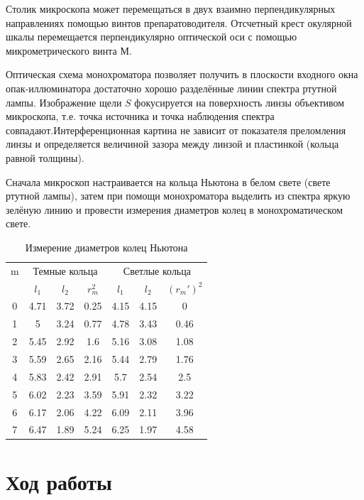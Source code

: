 \documentclass[12pt]{kiarticle}
\begin{document}
	Столик микроскопа может перемещаться в двух взаимно перпендикулярных направлениях помощью винтов препаратоводителя. Отсчетный крест окулярной шкалы перемещается перпендикулярно оптической оси с помощью микрометрического винта $ М $.
	
	Оптическая схема монохроматора позволяет получить в плоскости входного окна опак-иллюминатора достаточно хорошо разделённые линии спектра ртутной лампы. Изображение щели $ S $ фокусируется на поверхность линзы объективом микроскопа, т.е. точка источника и точка наблюдения спектра совпадают.Интерференционная картина не зависит от показателя преломления линзы и определяется величиной зазора между линзой и пластинкой (кольца равной толщины).

	Сначала микроскоп настраивается на кольца Ньютона в белом свете (свете ртутной лампы), затем при помощи монохроматора выделить из спектра яркую зелёную линию и провести измерения диаметров колец в монохроматическом свете. 
	
		\begin{table}[h!]
		\caption{Измерение диаметров колец Ньютона}
		\begin{center}
			\begin{tabular}{|c|c|c|c|c|c|c|}
				\hline
				m & \multicolumn{3}{|c|}{Темные кольца} & \multicolumn{3}{|c|}{Светлые кольца} \\
				\cline{2-7}
				& $ l_1 $& $ l_2 $ & $ r_m^2 $ &$ l_1 $& $ l_2 $ & $ (r_m')^2 $ \\
				\hline
				0 & 4.71 & 3.72 & 0.25 & 4.15 & 4.15 & 0 \\
				1 & 5 & 3.24 & 0.77 & 4.78 & 3.43 & 0.46 \\
				2 & 5.45 & 2.92 & 1.6 & 5.16 & 3.08 & 1.08 \\
				3 & 5.59 & 2.65 & 2.16 & 5.44 & 2.79 & 1.76 \\
				4 & 5.83 & 2.42 & 2.91 & 5.7 & 2.54 & 2.5 \\
				5 & 6.02 & 2.23 & 3.59 & 5.91 & 2.32 & 3.22 \\
				6 & 6.17 & 2.06 & 4.22 & 6.09 & 2.11 & 3.96 \\
				7 & 6.47 & 1.89 & 5.24 & 6.25 & 1.97 & 4.58 \\
				\hline
			\end{tabular}
		\end{center}
		\label{table}
	\end{table}
	
	
	\section{Ход работы}
	
\end{document}

